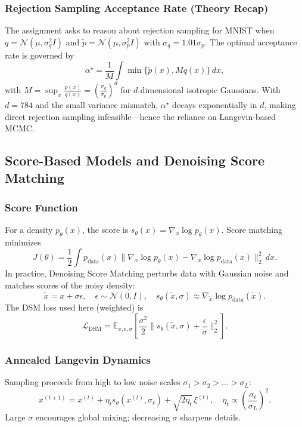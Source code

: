 \documentclass[conference]{IEEEtran}
\begin{document}
\subsubsection{Rejection Sampling Acceptance Rate (Theory Recap)}
The assignment asks to reason about rejection sampling for MNIST when $q = \mathcal{N}(\mu, \sigma_q^2 I)$ and $\tilde{p} = \mathcal{N}(\mu, \sigma_p^2 I)$ with $\sigma_q = 1.01 \sigma_p$. The optimal acceptance rate is governed by
\begin{equation}
    \alpha^\star = \frac{1}{M} \int \min\{ \tilde{p}(x), M q(x)\} \, dx,
\end{equation}
with $M = \sup_x \frac{\tilde{p}(x)}{q(x)} = \left(\frac{\sigma_q}{\sigma_p}\right)^d$ for $d$-dimensional isotropic Gaussians. With $d=784$ and the small variance mismatch, $\alpha^\star$ decays exponentially in $d$, making direct rejection sampling infeasible—hence the reliance on Langevin-based MCMC.

\subsection{Score-Based Models and Denoising Score Matching}
\subsubsection{Score Function}
For a density $p_\theta(x)$, the score is $s_\theta(x) = \nabla_x \log p_\theta(x)$. Score matching minimizes
\begin{equation}
    J(\theta) = \frac{1}{2} \int p_{\text{data}}(x) \|\nabla_x \log p_\theta(x) - \nabla_x \log p_{\text{data}}(x)\|_2^2 \, dx.
\end{equation}
In practice, Denoising Score Matching perturbs data with Gaussian noise and matches scores of the noisy density:
\begin{equation}
    \tilde{x} = x + \sigma \epsilon, \quad \epsilon \sim \mathcal{N}(0, I), \quad s_\theta(\tilde{x}, \sigma) \approx \nabla_{\tilde{x}} \log p_{\text{data}}(\tilde{x}).
\end{equation}
The DSM loss used here (weighted) is
\begin{equation}
    \mathcal{L}_{\text{DSM}} = \mathbb{E}_{x, \epsilon, \sigma} \left[ \frac{\sigma^2}{2} \big\| s_\theta(\tilde{x}, \sigma) + \frac{\epsilon}{\sigma} \big\|_2^2 \right].
\end{equation}

\subsubsection{Annealed Langevin Dynamics}
Sampling proceeds from high to low noise scales $\sigma_1 > \sigma_2 > \dots > \sigma_L$:
\begin{equation}
    x^{(t+1)} = x^{(t)} + \eta_t s_\theta(x^{(t)}, \sigma_\ell) + \sqrt{2\eta_t} \, \xi^{(t)}, \quad \eta_t \propto \left(\frac{\sigma_\ell}{\sigma_L}\right)^2.
\end{equation}
Large $\sigma$ encourages global mixing; decreasing $\sigma$ sharpens details.
\end{document}
